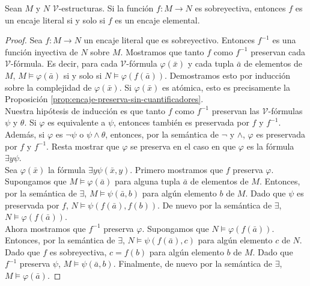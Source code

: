\documentclass[12pt,a4paper]{book}
\newcommand{\VV}{\mathcal{V}}
\begin{document}
    \begin{proposicion}\label{prop:encaje-biyectivo-elemental}
        Sean $M$ y $N$ $\VV$-estructuras. Si la función $f:M\rightarrow N$ es sobreyectiva, entonces $f$ es un encaje
        literal si y solo si $f$ es un encaje elemental.
    \end{proposicion}
    \begin{proof}
        Sea $f:M\rightarrow N$ un encaje literal que es sobreyectivo. Entonces $f^{-1}$ es una función inyectiva de $N$
        sobre $M$. Mostramos que tanto $f$ como $f^{-1}$ preservan cada $\VV$-fórmula. Es decir, para cada $\VV$-fórmula
        $\varphi(\bar{x})$ y cada tupla $\bar{a}$ de elementos de $M$, $M\models\varphi(\bar{a})$ si y solo si
        $N\models\varphi(f(\bar{a}))$. Demostramos esto por inducción sobre la complejidad de $\varphi(\bar{x})$. Si
        $\varphi(\bar{x})$ es atómica, esto es precisamente la Proposición \ref{prop:encaje-preserva-sin-cuantificadores}.\\
        Nuestra hipótesis de inducción es que tanto $f$ como $f^{-1}$ preservan las $\VV$-fórmulas $\psi$ y $\theta$. Si
        $\varphi$ es equivalente a $\psi$, entonces también es preservada por $f$ y $f^{-1}$. Además, si $\varphi$ es
        $\neg\psi$ o $\psi\wedge\theta$, entonces, por la semántica de $\neg$ y $\wedge$, $\varphi$ es preservada por $f$ y
        $f^{-1}$. Resta mostrar que $\varphi$ se preserva en el caso en que $\varphi$ es la fórmula $\exists y\psi$.\\
        Sea $\varphi(\bar{x})$ la fórmula $\exists y\psi(\bar{x},y)$. Primero mostramos que $f$ preserva $\varphi$.
        Supongamos que $M\models\varphi(\bar{a})$ para alguna tupla $\bar{a}$ de elementos de $M$. Entonces, por la
        semántica de $\exists$, $M\models\psi(\bar{a},b)$ para algún elemento $b$ de $M$. Dado que $\psi$ es preservada por
        $f$, $N\models\psi(f(\bar{a}),f(b))$. De nuevo por la semántica de $\exists$, $N\models\varphi(f(\bar{a}))$.\\
        Ahora mostramos que $f^{-1}$ preserva $\varphi$. Supongamos que $N\models\varphi(f(\bar{a}))$. Entonces, por la
        semántica de $\exists$, $N\models\psi(f(\bar{a}),c)$ para algún elemento $c$ de $N$. Dado que $f$ es sobreyectiva,
        $c=f(b)$ para algún elemento $b$ de $M$. Dado que $f^{-1}$ preserva $\psi$, $M\models\psi(\bar{a},b)$. Finalmente,
        de nuevo por la semántica de $\exists$, $M\models\varphi(\bar{a})$.
    \end{proof}
\end{document}

